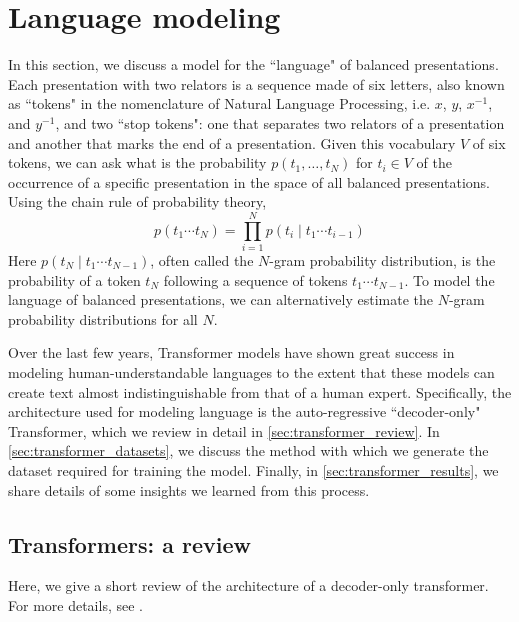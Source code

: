 
\section{Language modeling} \label{sec:lm}

In this section, we discuss a model for the ``language" of balanced presentations.
Each presentation with two relators is a sequence made of six letters, also known as ``tokens" in the nomenclature of Natural Language Processing, i.e. $x$, $y$, $x^{-1}$, and $y^{-1}$, and two ``stop tokens": one that separates two relators of a presentation and another that marks the end of a presentation.
Given this vocabulary $V$ of six tokens, we can ask what is the probability $p(t_1, \dots, t_N)$ for $t_i \in V$ of the occurrence of a specific presentation in the space of all balanced presentations.
Using the chain rule of probability theory,
\[
p(t_1 \cdots t_{N}) = \prod \limits_{i=1}^{N} p (t_{i} \mid t_{1} \cdots t_{i-1})
\]
Here $p (t_{N} \mid t_{1} \cdots t_{N-1})$, often called the $N$-gram probability distribution, is the probability of a token $t_N$ following a sequence of tokens $t_{1} \cdots t_{N-1}$.
To model the language of balanced presentations, we can alternatively estimate the $N$-gram probability distributions for all $N$.

Over the last few years, Transformer models have shown great success in modeling human-understandable languages to the extent that these models can create text almost indistinguishable from that of a human expert.
Specifically, the architecture used for modeling language is the auto-regressive ``decoder-only" Transformer, which we review in detail in \cref{sec:transformer_review}.
In \cref{sec:transformer_datasets}, we discuss the method with which we generate the dataset required for training the model.
Finally, in \cref{sec:transformer_results}, we share details of some insights we learned from this process.

\subsection{Transformers: a review\label{sec:transformer_review}}

Here, we give a short review of the architecture of a decoder-only transformer.
For more details, see \cite{vaswani2023attention, elhage2021mathematical, douglas2023large}.

